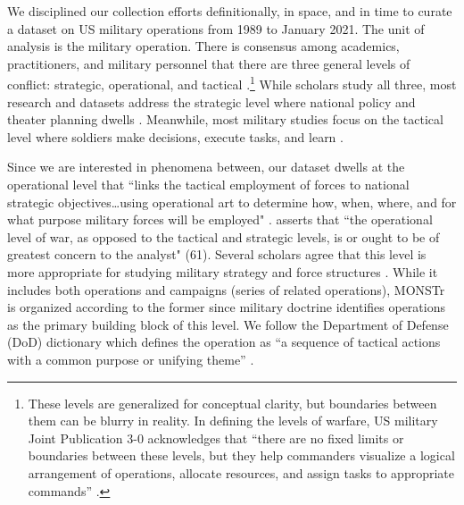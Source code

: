 \documentclass[fleqn,12pt]{article}
\begin{document}
We disciplined our collection efforts definitionally, in space, and in time to curate a dataset on US military operations from 1989 to January 2021. The unit of analysis is the military operation. There is consensus among academics, practitioners, and military personnel that there are three general levels of conflict: strategic, operational, and tactical \citep{clausewitz_war_1976, millett_effectivenessmilitaryorganizations_1986, zabecki_german1918offensives_2006}.\footnote{These levels are generalized for conceptual clarity, but boundaries between them can be blurry in reality. In defining the levels of warfare, US military Joint Publication 3-0 acknowledges that ``there are no fixed limits or boundaries between these levels, but they help commanders visualize a logical arrangement of operations, allocate resources, and assign tasks to appropriate commands” 
 \citep[I-12]{chairmanofthejointchiefsofstaff_jointpublication30_2018}.} While scholars study all three, most research and datasets address the strategic level where national policy and theater planning dwells \citep{mcmaster_derelictiondutyjohnson_1998, millett_lessonswar_1988}. Meanwhile, most military studies focus on the tactical level where soldiers make decisions, execute tasks, and learn \citep{harkness_militarymaladaptationcounterinsurgency_2015, kollars_warhorizonsoldierled_2015}.

Since we are interested in phenomena between, our dataset dwells at the operational level that ``links the tactical employment of forces to national strategic objectives…using operational art to determine how, when, where, and for what purpose military forces will be employed" \citep{chairmanofthejointchiefsofstaff_jointpublication30_2018}. \citet{luttwak_operationallevelwar_1981} asserts that ``the operational level of war, as opposed to the tactical and strategic levels, is or ought to be of greatest concern to the analyst" (61). Several scholars agree that this level is more appropriate for studying military strategy and force structures \citep{allen_understandingimpactair_2017, tecottmetz_casecampaignanalysis_2021}. While it includes both operations and campaigns (series of related operations), MONSTr is organized according to the former since military doctrine identifies operations as the primary building block of this level. We follow the Department of Defense (DoD) dictionary which defines the operation as ``a sequence of tactical actions with a common purpose or unifying theme” \citep[GL-13]{chairmanofthejointchiefsofstaff_doddictionarymilitary_2021}.
\end{document}
